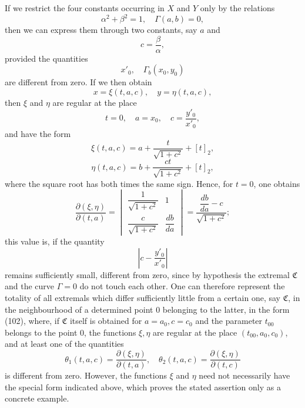 \documentclass[11pt,a4paper,leqno]{article}
\begin{document}
If we restrict the four constants occurring in $X$ and $Y$ only by the relations
\[
\alpha^2+\beta^2=1,
\quad
\Gamma(a,b)=0,
\]
then we can express them through two constants, say $a$ and
\[
c=\frac{\beta}{\alpha},
\]
provided the quantities
\[
x'_0,
\quad
\Gamma_b(x_0,y_0)
\]
are different from zero. If we then obtain
\begin{equation}\tag{102}
x=\xi(t,a,c),
\quad
y=\eta(t,a,c),
\end{equation}
then $\xi$ and $\eta$ are regular at the place
\[
t=0,
\quad
a=x_0,
\quad
c=\frac{y'_0}{x'_0},
\]
and have the form
\[
\xi(t,a,c)=a+\frac{t}{\sqrt{1+c^2}}+[t]_2,
\]
\[
\eta(t,a,c)=b+\frac{ct}{\sqrt{1+c^2}}+[t]_2,
\]
where the square root has both times the same sign. Hence, for $t=0$, one obtains
\[
\frac{\partial(\xi,\eta)}{\partial(t,a)}=
\begin{vmatrix}
\dfrac{1}{\sqrt{1+c^2}}&1\\[1.2ex]
\dfrac{c}{\sqrt{1+c^2}}&\dfrac{db}{da}
\end{vmatrix}
=\frac{\dfrac{db}{da}-c}{\sqrt{1+c^2}};
\]
this value is, if the quantity
\[
\left|c-\frac{y'_0}{x'_0}\right|
\]
remains sufficiently small, different from zero, since by hypothesis the extremal $\mathfrak C$ and the curve $\Gamma=0$ do not touch each other. One can therefore represent the totality of all extremals which differ sufficiently little from a certain one, say $\mathfrak C$, in the neighbourhood of a determined point 0 belonging to the latter, in the form (102), where, if $\mathfrak C$ itself is obtained for $a=a_0,c=c_0$ and the parameter $t_{00}$ belongs to the point 0, the functions $\xi,\eta$ are regular at the place $(t_{00},a_0,c_0)$, and at least one of the quantities
\[
\theta_1(t,a,c)=\frac{\partial(\xi,\eta)}{\partial(t,a)},
\quad
\theta_2(t,a,c)=\frac{\partial(\xi,\eta)}{\partial(t,c)}
\]
is different from zero. However, the functions $\xi$ and $\eta$ need not necessarily have the special form indicated above, which proves the stated assertion only as a concrete example.
\end{document}
